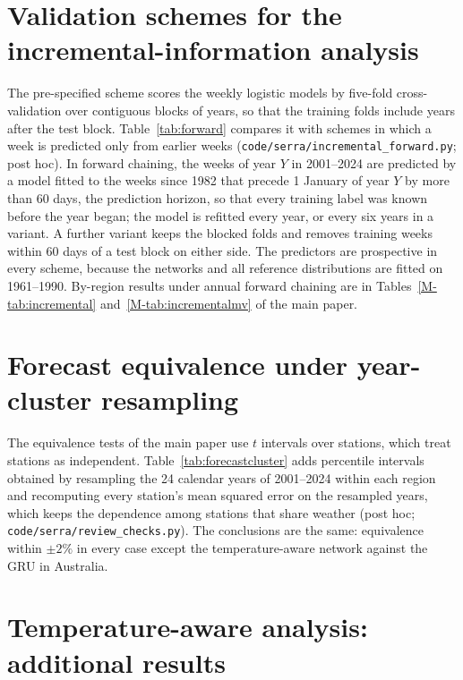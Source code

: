 \documentclass[pdflatex,sn-mathphys-ay]{sn-jnl}
\begin{document}
\section{Validation schemes for the incremental-information analysis}\label{sec:forward}
The pre-specified scheme scores the weekly logistic models by five-fold cross-validation over contiguous
blocks of years, so that the training folds include years after the test block.
Table~\ref{tab:forward} compares it with schemes in which a week is predicted only from earlier weeks
(\texttt{code/serra/incremental\_forward.py}; post hoc). In forward chaining, the weeks of year $Y$ in
2001--2024 are predicted by a model fitted to the weeks since 1982 that precede 1 January of year $Y$ by
more than 60 days, the prediction horizon, so that every training label was known before the year began;
the model is refitted every year, or every six years in a variant. A further variant keeps the blocked
folds and removes training weeks within 60 days of a test block on either side. The predictors are
prospective in every scheme, because the networks and all reference distributions are fitted on
1961--1990. By-region results under annual forward chaining are in Tables~\ref{M-tab:incremental}
and~\ref{M-tab:incrementalmv} of the main paper.


\FloatBarrier

\section{Forecast equivalence under year-cluster resampling}\label{sec:forecastcluster}
The equivalence tests of the main paper use $t$ intervals over stations, which treat stations as
independent. Table~\ref{tab:forecastcluster} adds percentile intervals obtained by resampling the 24
calendar years of 2001--2024 within each region and recomputing every station's mean squared error on the
resampled years, which keeps the dependence among stations that share weather (post hoc;
\texttt{code/serra/review\_checks.py}). The conclusions are the same: equivalence within $\pm2\%$ in
every case except the temperature-aware network against the GRU in Australia.


\FloatBarrier

\section{Temperature-aware analysis: additional results}\label{sec:mvsupp}




\FloatBarrier
\end{document}
